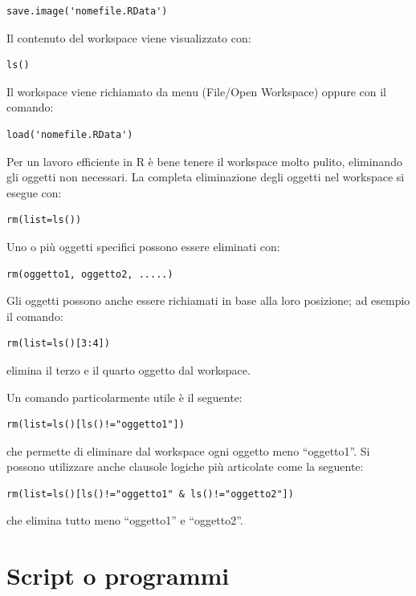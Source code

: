 \documentclass[a4paper,12pt,oneside]{book}
\begin{document}
\begin{verbatim}
save.image('nomefile.RData')
\end{verbatim}

Il contenuto del workspace viene visualizzato con:

\begin{verbatim}
ls()
\end{verbatim}

Il workspace viene richiamato da menu (File/Open Workspace) oppure con
il comando:

\begin{verbatim}
load('nomefile.RData')
\end{verbatim}

Per un lavoro efficiente in R è bene tenere il workspace molto pulito,
eliminando gli oggetti non necessari. La completa eliminazione degli
oggetti nel workspace si esegue con:

\begin{verbatim}
rm(list=ls())
\end{verbatim}

Uno o più oggetti specifici possono essere eliminati con:

\begin{verbatim}
rm(oggetto1, oggetto2, .....)
\end{verbatim}

Gli oggetti possono anche essere richiamati in base alla loro posizione;
ad esempio il comando:

\begin{verbatim}
rm(list=ls()[3:4])
\end{verbatim}

elimina il terzo e il quarto oggetto dal workspace.

Un comando particolarmente utile è il seguente:

\begin{verbatim}
rm(list=ls()[ls()!="oggetto1"])
\end{verbatim}

che permette di eliminare dal workspace ogni oggetto meno ``oggetto1''.
Si possono utilizzare anche clausole logiche più articolate come la
seguente:

\begin{verbatim}
rm(list=ls()[ls()!="oggetto1" & ls()!="oggetto2"])
\end{verbatim}

che elimina tutto meno ``oggetto1'' e ``oggetto2''.

\section{Script o programmi}\label{script-o-programmi}
\end{document}
